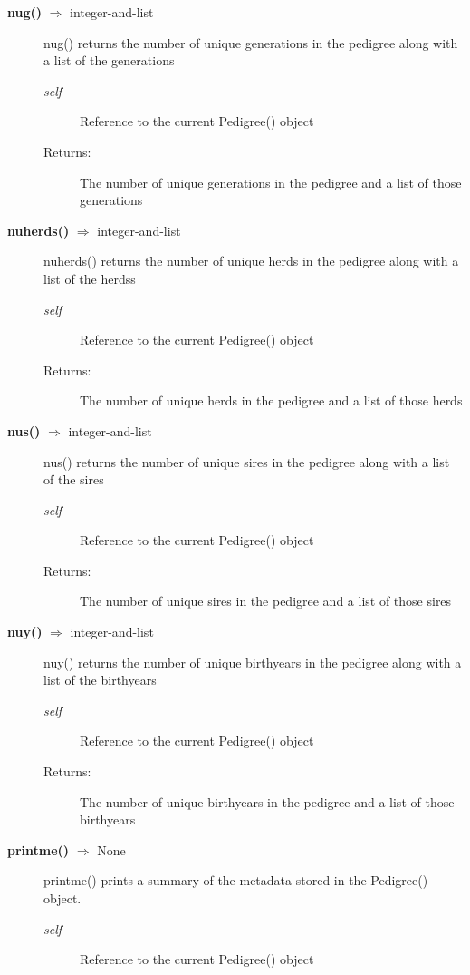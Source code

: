 \begin{description}
\item[\textbf{nug()} $\Rightarrow$ integer-and-list]
nug() returns the number of unique generations in the pedigree along with a list of the generations
\begin{description}
\item[\emph{self}] Reference to the current Pedigree() object
\item[Returns:] The number of unique generations in the pedigree and a list of those generations
\end{description}

\item[\textbf{nuherds()} $\Rightarrow$ integer-and-list]
nuherds() returns the number of unique herds in the pedigree along with a list of the herdss
\begin{description}
\item[\emph{self}] Reference to the current Pedigree() object
\item[Returns:] The number of unique herds in the pedigree and a list of those herds
\end{description}

\item[\textbf{nus()} $\Rightarrow$ integer-and-list]
nus() returns the number of unique sires in the pedigree along with a list of the sires
\begin{description}
\item[\emph{self}] Reference to the current Pedigree() object
\item[Returns:] The number of unique sires in the pedigree and a list of those sires
\end{description}

\item[\textbf{nuy()} $\Rightarrow$ integer-and-list]
nuy() returns the number of unique birthyears in the pedigree along with a list of the birthyears
\begin{description}
\item[\emph{self}] Reference to the current Pedigree() object
\item[Returns:] The number of unique birthyears in the pedigree and a list of those birthyears
\end{description}

\item[\textbf{printme()} $\Rightarrow$ None]
printme() prints a summary of the metadata stored in the Pedigree() object.
\begin{description}
\item[\emph{self}] Reference to the current Pedigree() object
\end{description}


\end{description}
